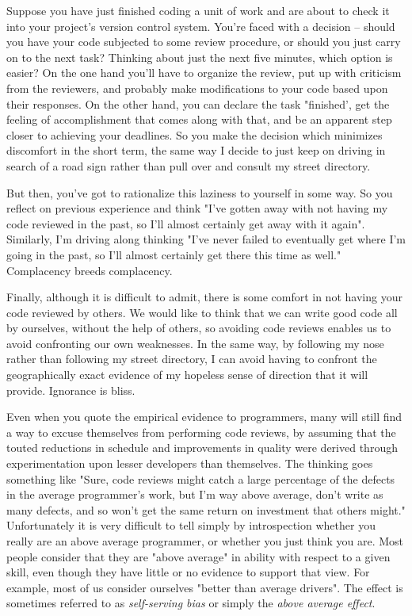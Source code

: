 \documentclass{article}
\begin{document}
\begin{enumerate}
Suppose you have just finished coding a unit of work and are about to
check it into your project's version control system. You're faced with a
decision -- should you have your code subjected to some review
procedure, or should you just carry on to the next task? Thinking about
just the next five minutes, which option is easier? On the one hand
you'll have to organize the review, put up with criticism from the
reviewers, and probably make modifications to your code based upon their
responses. On the other hand, you can declare the task "finished', get
the feeling of accomplishment that comes along with that, and be an
apparent step closer to achieving your deadlines. So you make the
decision which minimizes discomfort in the short term, the same way I
decide to just keep on driving in search of a road sign rather than pull
over and consult my street directory.

But then, you've got to rationalize this laziness to yourself in some
way. So you reflect on previous experience and think "I've gotten away
with not having my code reviewed in the past, so I'll almost certainly
get away with it again". Similarly, I'm driving along thinking "I've
never failed to eventually get where I'm going in the past, so I'll
almost certainly get there this time as well." Complacency breeds
complacency.

Finally, although it is difficult to admit, there is some comfort in not
having your code reviewed by others. We would like to think that we can
write good code all by ourselves, without the help of others, so
avoiding code reviews enables us to avoid confronting our own
weaknesses. In the same way, by following my nose rather than following
my street directory, I can avoid having to confront the geographically
exact evidence of my hopeless sense of direction that it will provide.
Ignorance is bliss.

Even when you quote the empirical evidence to programmers, many will
still find a way to excuse themselves from performing code reviews, by
assuming that the touted reductions in schedule and improvements in
quality were derived through experimentation upon lesser developers than
themselves. The thinking goes something like "Sure, code reviews might
catch a large percentage of the defects in the average programmer's
work, but I'm way above average, don't write as many defects, and so
won't get the same return on investment that others might."
Unfortunately it is very difficult to tell simply by introspection
whether you really are an above average programmer, or whether you just
think you are. Most people consider that they are "above average" in
ability with respect to a given skill, even though they have little or
no evidence to support that view. For example, most of us consider
ourselves "better than average drivers". The effect is sometimes
referred to as \emph{self-serving bias} or simply the \emph{above average effect}.


\end{enumerate}
\end{document}

